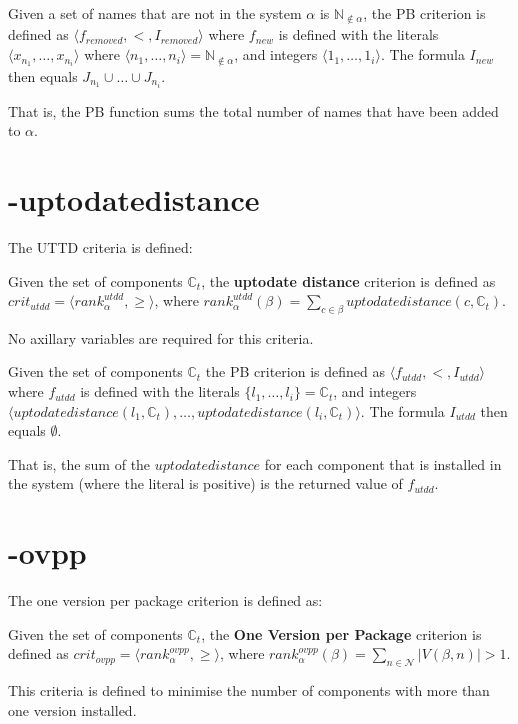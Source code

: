 \begin{defs}
Given a set of names that are not in the system $\alpha$ is $\mathbb{N}_{\not \in \alpha}$, the PB criterion is defined as $\langle f_{removed}, <, I_{removed} \rangle$ where 
$f_{new}$ is defined with the literals $\langle x_{n_1},\ldots, x_{n_i}\rangle$ where $\langle n_1,\ldots, n_i \rangle = \mathbb{N}_{\not \in \alpha}$, and integers $\langle 1_1,\ldots,1_i\rangle$.
The formula $I_{new}$ then equals $J_{n_1} \cup \ldots \cup J_{n_i}$.
\end{defs}
That is, the PB function sums the total number of names that have been added to $\alpha$.

\section{-uptodatedistance}

The UTTD criteria is defined:
\begin{defs}
	Given the set of components $\mathbb{C}_t$, the \textbf{uptodate distance} criterion is defined as $crit_{utdd} = \langle rank^{utdd}_{\alpha}, \geq \rangle$,
	where $rank^{utdd}_{\alpha}(\beta) = \sum_{c \in \beta} uptodatedistance(c,\mathbb{C}_t)$.
\end{defs}

No axillary variables are required for this criteria.

\begin{defs}
Given the set of components $\mathbb{C}_t$ the PB criterion is defined as $\langle f_{utdd}, <, I_{utdd} \rangle$ where 
$f_{utdd}$ is defined with the literals $\{l_1,\ldots,l_i\} = \mathbb{C}_t$, and integers 
$\langle uptodatedistance(l_1,\mathbb{C}_t), \ldots ,uptodatedistance(l_i,\mathbb{C}_t)\rangle$.
The formula $I_{utdd}$ then equals $\emptyset$.
\end{defs}
That is, the sum of the $uptodatedistance$ for each component that is installed in the system (where the literal is positive) is the returned value of $f_{utdd}$.

\section{-ovpp}
The one version per package criterion is defined as:
\begin{defs}
	Given the set of components $\mathbb{C}_t$, the \textbf{One Version per Package} criterion is defined as $crit_{ovpp} = \langle rank^{ovpp}_{\alpha}, \geq \rangle$,
	where $rank^{ovpp}_{\alpha}(\beta) = \sum_{n \in \mathcal{N}} |V(\beta,n)| > 1$.
\end{defs}
This criteria is defined to minimise the number of components with more than one version installed.

